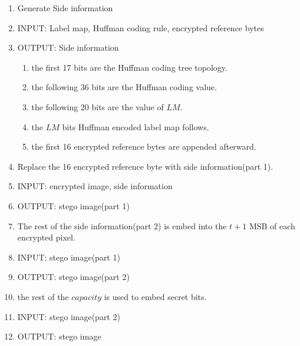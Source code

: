\documentclass{article}
\begin{document}
\begin{enumerate}
	\item Generate Side information
	\item[] INPUT: Label map, Huffman coding rule, encrypted reference bytes
	\item[] OUTPUT: Side information
	      \begin{enumerate}
		      \item the first 17 bits are the Huffman coding tree topology.
		      \item the following 36 bits are the Huffman coding value.
		      \item the following 20 bits are the value of $LM$.
		      \item the $LM$ bits Huffman encoded label map follows.
		      \item the first 16 encrypted reference bytes are appended afterward.
	      \end{enumerate}
	      
	\item Replace the 16 encrypted reference byte with side information(part 1).
	\item[] INPUT: encrypted image, side information
	\item[] OUTPUT: stego image(part 1)
	      
	\item The rest of the side information(part 2) is embed into the $t+1$ MSB of each encrypted pixel.
	\item[] INPUT: stego image(part 1)
	\item[] OUTPUT: stego image(part 2)
	      
	\item the rest of the $capacity$ is used to embed secret bits.
	\item[] INPUT: stego image(part 2)
	\item[] OUTPUT: stego image
\end{enumerate}
\end{document}
